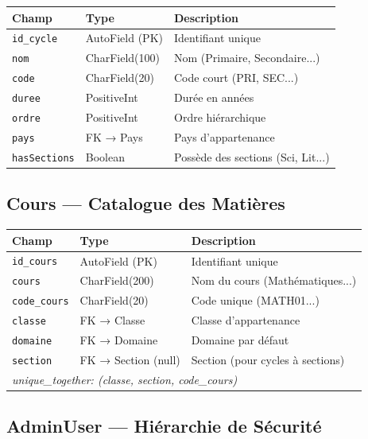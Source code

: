 \documentclass[12pt,a4paper,oneside]{report}
\begin{document}
\begin{center}
\begin{tabularx}{\textwidth}{l l X}
\toprule
\textbf{Champ} & \textbf{Type} & \textbf{Description} \\
\midrule
\texttt{id\_cycle} & AutoField (PK) & Identifiant unique \\
\texttt{nom} & CharField(100) & Nom (Primaire, Secondaire...) \\
\texttt{code} & CharField(20) & Code court (PRI, SEC...) \\
\texttt{duree} & PositiveInt & Durée en années \\
\texttt{ordre} & PositiveInt & Ordre hiérarchique \\
\texttt{pays} & FK → Pays & Pays d'appartenance \\
\texttt{hasSections} & Boolean & Possède des sections (Sci, Lit...) \\
\bottomrule
\end{tabularx}
\end{center}

\subsection{Cours — Catalogue des Matières}

\begin{center}
\begin{tabularx}{\textwidth}{l l X}
\toprule
\textbf{Champ} & \textbf{Type} & \textbf{Description} \\
\midrule
\texttt{id\_cours} & AutoField (PK) & Identifiant unique \\
\texttt{cours} & CharField(200) & Nom du cours (Mathématiques...) \\
\texttt{code\_cours} & CharField(20) & Code unique (MATH01...) \\
\texttt{classe} & FK → Classe & Classe d'appartenance \\
\texttt{domaine} & FK → Domaine & Domaine par défaut \\
\texttt{section} & FK → Section (null) & Section (pour cycles à sections) \\
\multicolumn{3}{l}{\textit{unique\_together: (classe, section, code\_cours)}} \\
\bottomrule
\end{tabularx}
\end{center}

\subsection{AdminUser — Hiérarchie de Sécurité}
\end{document}
